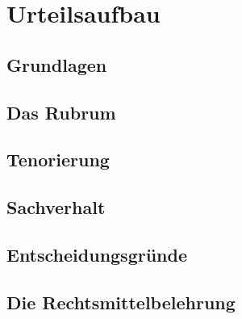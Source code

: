 
\chapter{Urteilsaufbau}
\blindtext[1]
\section{Grundlagen}
\blindtext[1]
\section{Das Rubrum}
\blindtext[1]
\section{Tenorierung}
\blindtext[5]
\section{Sachverhalt}
\blindtext[5]
\section{Entscheidungsgründe}
\blindtext[5]
\section{Die Rechtsmittelbelehrung}
\blindtext[1]

\chapterbib
